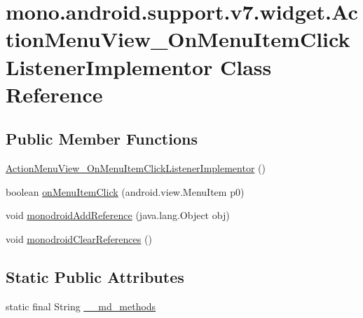 \hypertarget{classmono_1_1android_1_1support_1_1v7_1_1widget_1_1_action_menu_view___on_menu_item_click_listener_implementor}{
\section{mono.android.support.v7.widget.ActionMenuView\_\-OnMenuItemClickListenerImplementor Class Reference}
\label{classmono_1_1android_1_1support_1_1v7_1_1widget_1_1_action_menu_view___on_menu_item_click_listener_implementor}
}
\subsection*{Public Member Functions}
\begin{CompactItemize}
\item 
\hyperlink{classmono_1_1android_1_1support_1_1v7_1_1widget_1_1_action_menu_view___on_menu_item_click_listener_implementor_ccf13daa01c9bffe77664d8a4a92bd91}{ActionMenuView\_\-OnMenuItemClickListenerImplementor} ()
\item 
boolean \hyperlink{classmono_1_1android_1_1support_1_1v7_1_1widget_1_1_action_menu_view___on_menu_item_click_listener_implementor_a7f3b619c6a59d9cdca534581c1a6296}{onMenuItemClick} (android.view.MenuItem p0)
\item 
void \hyperlink{classmono_1_1android_1_1support_1_1v7_1_1widget_1_1_action_menu_view___on_menu_item_click_listener_implementor_e2429823c873f4a58b4cf51c81bc06e9}{monodroidAddReference} (java.lang.Object obj)
\item 
void \hyperlink{classmono_1_1android_1_1support_1_1v7_1_1widget_1_1_action_menu_view___on_menu_item_click_listener_implementor_9e0f4ab4d26d48e5e567bd67f4464001}{monodroidClearReferences} ()
\end{CompactItemize}
\subsection*{Static Public Attributes}
\begin{CompactItemize}
\item 
static final String \hyperlink{classmono_1_1android_1_1support_1_1v7_1_1widget_1_1_action_menu_view___on_menu_item_click_listener_implementor_a8cb9f08db4743ab028af01b66a66cf1}{\_\-\_\-md\_\-methods}
\end{CompactItemize}
